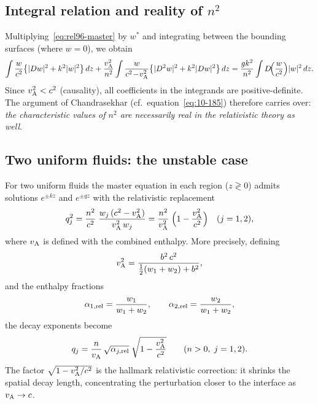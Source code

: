 \subsection{Integral relation and reality of $n^{2}$}

Multiplying~\eqref{eq:rel96-master} by $w^{*}$ and integrating between
the bounding surfaces (where $w=0$), we obtain
\begin{equation}
  \int\frac{w}{c^{2}}
    \bigl\{|Dw|^{2}+k^{2}|w|^{2}\bigr\}\,dz
  + \frac{v_{\mathrm{A}}^{2}}{n^{2}}\int\frac{w}{c^{2}\!-\!v_{\mathrm{A}}^{2}}
    \bigl\{|D^{2}w|^{2}+k^{2}|Dw|^{2}\bigr\}\,dz
  = \frac{gk^{2}}{n^{2}}\int D\!\Bigl(\frac{w}{c^{2}}\Bigr)
    |w|^{2}\,dz.
  \label{eq:rel96-integral}
\end{equation}
Since $v_{\mathrm{A}}^{2}<c^{2}$ (causality), all coefficients in the integrands
are positive-definite.  The argument of
Chandrasekhar (cf.\ equation~\eqref{eq:10-185}) therefore carries over:
\emph{the characteristic values of $n^{2}$ are necessarily real in the
relativistic theory as well}.

\subsection{Two uniform fluids: the unstable case}
\label{sec:rel96-unstable}

For two uniform fluids the master equation in each region ($z\gtrless 0$)
admits solutions $e^{\pm kz}$ and $e^{\pm qz}$ with the relativistic
replacement
\begin{equation}
  q_{j}^{2}
    = \frac{n^{2}}{c^{2}}\;\frac{w_{j}\,(c^{2}-v_{\mathrm{A}}^{2})}{v_{\mathrm{A}}^{2}\,w_{j}}
    = \frac{n^{2}}{v_{\mathrm{A}}^{2}}\;\Bigl(1 - \frac{v_{\mathrm{A}}^{2}}{c^{2}}\Bigr)
    \quad(j=1,2),
  \label{eq:rel96-qj-gen}
\end{equation}
where $v_{\mathrm{A}}$ is defined with the combined enthalpy.  More precisely,
defining
\begin{equation}
  v_{\mathrm{A}}^{2}
    = \frac{b^{2}\,c^{2}}{\tfrac{1}{2}(w_{1}+w_{2}) + b^{2}},
  \label{eq:rel96-vA-combined}
\end{equation}
and the enthalpy fractions
\begin{equation}
  \alpha_{1,\text{rel}}
    = \frac{w_{1}}{w_{1}+w_{2}},
  \qquad
  \alpha_{2,\text{rel}}
    = \frac{w_{2}}{w_{1}+w_{2}},
  \label{eq:rel96-alpha-rel}
\end{equation}
the decay exponents become
\begin{equation}
  q_{j}
    = \frac{n}{v_{\mathrm{A}}}\,\sqrt{\alpha_{j,\text{rel}}}\;
      \sqrt{1 - \frac{v_{\mathrm{A}}^{2}}{c^{2}}}
  \qquad(n>0,\;j=1,2).
  \label{eq:rel96-qj}
\end{equation}
The factor $\sqrt{1-v_{\mathrm{A}}^{2}/c^{2}}$ is the hallmark relativistic
correction: it shrinks the spatial decay length, concentrating the
perturbation closer to the interface as $v_{\mathrm{A}}\to c$.

